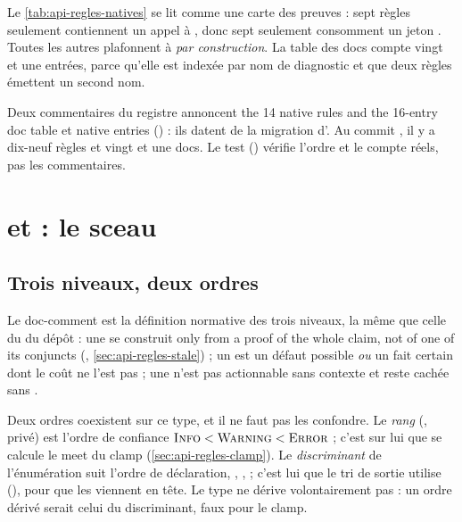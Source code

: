 Le \cref{tab:api-regles-natives} se lit comme une carte des preuves : sept règles seulement contiennent un appel à , donc sept seulement consomment un jeton . Toutes les autres plafonnent à \Warning{} \emph{par construction}. La table des docs compte vingt et une entrées, parce qu'elle est indexée par nom de diagnostic et que deux règles émettent un second nom.

\begin{piege}
Deux commentaires du registre annoncent \og the 14 native rules and the 16-entry doc table\fg{} et  native entries\fg{} () : ils datent de la migration d'. Au commit \snapshotCommit, il y a dix-neuf règles et vingt et une docs. Le test  () vérifie l'ordre et le compte réels, pas les commentaires.
\end{piege}

\section{ et  : le sceau}
\label{sec:api-regles-sceau}

\subsection{Trois niveaux, deux ordres}


Le doc-comment est la définition normative des trois niveaux, la même que celle du  du dépôt : une \Error{} se construit \og only from a proof of the whole claim, not of one of its conjuncts\fg{} (, \cref{sec:api-regles-stale}) ; un \Warning{} est un défaut possible \emph{ou} un fait certain dont le coût ne l'est pas ; une \Info{} n'est pas actionnable sans contexte et reste cachée sans .

Deux ordres coexistent sur ce type, et il ne faut pas les confondre. Le \emph{rang} (, privé) est l'ordre de confiance $\textsc{Info} < \textsc{Warning} < \textsc{Error}$ ; c'est sur lui que se calcule le meet du clamp (\cref{sec:api-regles-clamp}). Le \emph{discriminant} de l'énumération suit l'ordre de déclaration, , ,  ; c'est lui que le tri de sortie utilise (), pour que les \Error{} viennent en tête. Le type ne dérive volontairement pas  : un ordre dérivé serait celui du discriminant, faux pour le clamp.

